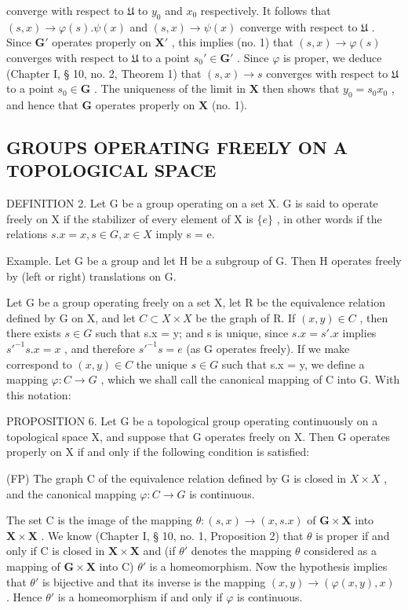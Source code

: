 converge with respect to \(\mathfrak{U}\) to \(y_0\) and \(x_0\) respectively. It follows that \((s, x) \to \varphi(s). \psi(x)\) and \((s, x) \to \psi(x)\) converge with respect to \(\mathfrak{U}\) . Since \(\mathbf{G}'\) operates properly on \(\mathbf{X}'\) , this implies (no. 1) that \((s, x) \to \varphi(s)\) converges with respect to \(\mathfrak{U}\) to a point \(s_0' \in \mathbf{G}'\) . Since \(\varphi\) is proper, we deduce (Chapter I, § 10, no. 2, Theorem 1) that \((s, x) \to s\) converges with respect to \(\mathfrak{U}\) to a point \(s_0 \in \mathbf{G}\) . The uniqueness of the limit in \(\mathbf{X}\) then shows that \(y_0 = s_0 x_0\) , and hence that \(\mathbf{G}\) operates properly on \(\mathbf{X}\) (no. 1).

\subsection{GROUPS OPERATING FREELY ON A TOPOLOGICAL SPACE}

DEFINITION 2. Let G be a group operating on a set X. G is said to operate freely on X if the stabilizer of every element of X is \(\{e\}\) , in other words if the relations \(s.x = x, s \in G, x \in X\) imply s = e.

Example. Let G be a group and let H be a subgroup of G. Then H operates freely by (left or right) translations on G.

Let G be a group operating freely on a set X, let R be the equivalence relation defined by G on X, and let \(C \subset X \times X\) be the graph of R. If \((x, y) \in C\) , then there exists \(s \in G\) such that s.x = y; and s is unique, since \(s.x = s'.x\) implies \(s'^{-1}s.x = x\) , and therefore \(s'^{-1}s = e\) (as G operates freely). If we make correspond to \((x, y) \in C\) the unique \(s \in G\) such that s.x = y, we define a mapping \(\varphi: C \to G\) , which we shall call the canonical mapping of C into G. With this notation:

PROPOSITION 6. Let G be a topological group operating continuously on a topological space X, and suppose that G operates freely on X. Then G operates properly on X if and only if the following condition is satisfied:

(FP) The graph C of the equivalence relation defined by G is closed in \(X \times X\) , and the canonical mapping \(\varphi: C \rightarrow G\) is continuous.

The set C is the image of the mapping \(\theta: (s, x) \to (x, s.x)\) of \(\mathbf{G} \times \mathbf{X}\) into \(\mathbf{X} \times \mathbf{X}\) . We know (Chapter I, § 10, no. 1, Proposition 2) that \(\theta\) is proper if and only if C is closed in \(\mathbf{X} \times \mathbf{X}\) and (if \(\theta'\) denotes the mapping \(\theta\) considered as a mapping of \(\mathbf{G} \times \mathbf{X}\) into C) \(\theta'\) is a homeomorphism. Now the hypothesis implies that \(\theta'\) is bijective and that its inverse is the mapping \((x, y) \to (\varphi(x, y), x)\) . Hence \(\theta'\) is a homeomorphism if and only if \(\varphi\) is continuous.

